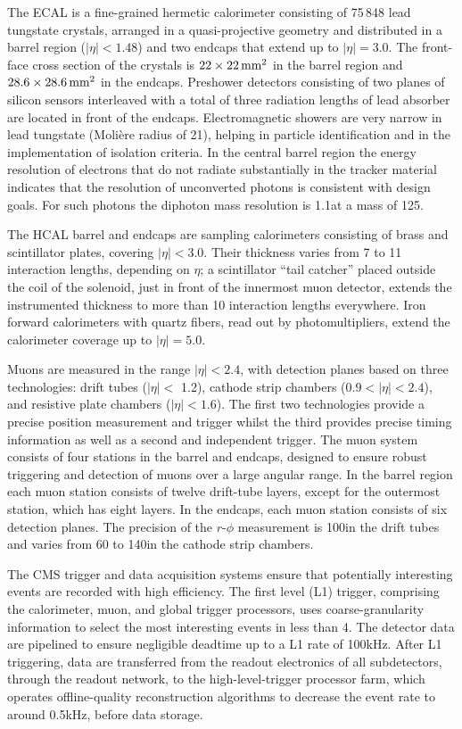 \documentclass[11pt,twoside,a4paper,cmspaper,final]{cms-tdr}
\begin{document}
The ECAL is a fine-grained hermetic calorimeter consisting of 75\,848
lead tungstate crystals, arranged in a quasi-projective geometry and distributed in a
barrel region ($|\eta| < 1.48$) and two endcaps that extend up to $|\eta| = 3.0$.
The front-face cross section of the crystals is $22\times 22\,\text{mm}^2$ in the barrel region
and $28.6\times 28.6\,\text{mm}^2$ in the endcaps.
Preshower detectors consisting of two planes of silicon sensors interleaved with a total of
three radiation lengths of lead absorber are located in front of the endcaps. Electromagnetic showers
are very narrow in lead tungstate (Moli\`ere radius of 21\mm), helping in particle
identification and in the implementation of isolation criteria.
In the central barrel region the energy resolution of electrons that
do not radiate substantially in the tracker material indicates that
the resolution of unconverted photons is consistent with design goals.
For such photons the diphoton mass resolution is
1.1\GeV at a mass of 125\GeV.

The HCAL barrel and endcaps are sampling calorimeters consisting of brass and
scintillator plates, covering $|\eta| < 3.0$. Their thickness varies from 7 to 11
interaction lengths, depending on $\eta$; a scintillator ``tail catcher'' placed outside
the coil of the solenoid, just in front of the innermost muon detector, extends the instrumented thickness to more
than 10 interaction lengths everywhere.  Iron forward calorimeters with quartz fibers, read
out by photomultipliers, extend the calorimeter coverage up to
$|\eta| = 5.0$.

Muons are measured in the range $|\eta| < 2.4$, with detection planes based on
three technologies: drift tubes ($|\eta| <$ 1.2), cathode strip chambers
($0.9 < |\eta| < 2.4$), and resistive plate chambers ($|\eta| < 1.6$).
The first two technologies provide a precise position measurement and
trigger whilst the third provides precise timing
information as well as a second and independent trigger.
The muon system consists of four stations in the barrel and endcaps, designed to ensure robust
triggering and detection of muons
over a large angular range. In the barrel region each muon station consists of twelve
drift-tube layers, except for the outermost station, which has eight layers. In the endcaps, each
muon station consists of six detection planes. The precision of the $r$-$\phi$
measurement is 100\mum in the drift tubes and varies from 60 to
140\mum in the cathode strip chambers.

The CMS trigger and data acquisition systems ensure that potentially
interesting events are recorded with high efficiency. The first level (L1)
trigger, comprising the calorimeter, muon, and global trigger
processors, uses
coarse-granularity information to select the most interesting events in less than 4\mus. The
detector data are pipelined to ensure negligible deadtime up to a L1
rate of 100\unit{kHz}.
After L1 triggering, data are transferred from the readout electronics of all subdetectors,
through the readout network, to the high-level-trigger processor farm, which
operates offline-quality reconstruction algorithms to decrease the event rate to around
0.5\unit{kHz}, before data storage.
\end{document}
